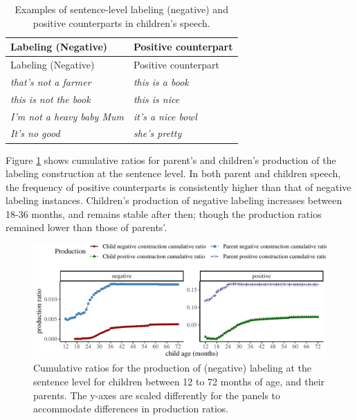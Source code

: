 \documentclass[
  man,floatsintext]{apa6}
\begin{document}
\begin{longtable}[]{@{}ll@{}}
\caption{\label{tab:label} Examples of sentence-level labeling (negative) and positive counterparts in children's speech.}\tabularnewline
\toprule\noalign{}
Labeling (Negative) & Positive counterpart \\
\midrule\noalign{}
\endfirsthead
\toprule\noalign{}
Labeling (Negative) & Positive counterpart \\
\midrule\noalign{}
\endhead
\bottomrule\noalign{}
\endlastfoot
\emph{that's not a farmer} & \emph{this is a book} \\
\emph{this is not the book} & \emph{this is nice} \\
\emph{I'm not a heavy baby Mum} & \emph{it's a nice bowl} \\
\emph{It's no good} & \emph{she's pretty} \\
\end{longtable}

Figure \ref{fig:learning} shows cumulative ratios for parent's and children's production of the labeling construction at the sentence level. In both parent and children speech, the frequency of positive counterparts is consistently higher than that of negative labeling instances. Children's production of negative labeling increases between 18-36 months, and remains stable after then; though the production ratios remained lower than those of parents'.

\begin{figure}[H]

{\centering \includegraphics{neg_construction_article_files/figure-latex/learning-1} 

}

\caption{Cumulative ratios for the production of (negative) labeling at the sentence level for children between 12 to 72 months of age, and their parents. The y-axes are scaled differently for the panels to accommodate differences in production ratios.}\label{fig:learning}
\end{figure}
\end{document}
